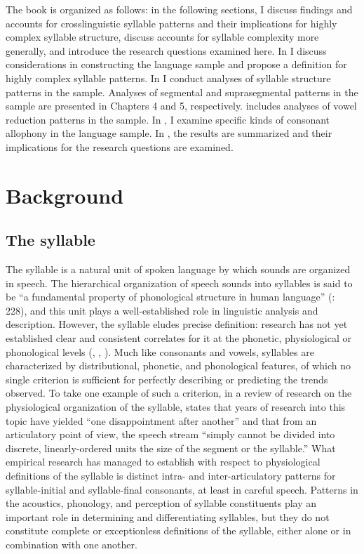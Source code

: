   The book is organized as follows: in the following sections, I discuss findings and accounts for crosslinguistic syllable patterns and their implications for highly complex syllable structure, discuss accounts for syllable complexity more generally, and introduce the research questions examined here. In  I discuss considerations in constructing the language sample and propose a definition for highly complex syllable patterns. In  I conduct analyses of syllable structure patterns in the sample. Analyses of segmental and suprasegmental patterns in the sample are presented in Chapters 4 and 5, respectively.  includes analyses of vowel reduction patterns in the sample. In , I examine specific kinds of consonant allophony in the language sample. In , the results are summarized and their implications for the research questions are examined.

\section{Background}\label{sec:1.1}
\subsection{The syllable}\label{sec:1.1.1}

  The syllable is a natural unit of spoken language by which sounds are organized in speech. The hierarchical organization of speech sounds into syllables is said to be “a fundamental property of phonological structure in human language” (\citealt{GoldsteinEtAl2006}: 228), and this unit plays a well-established role in linguistic analysis and description. However, the syllable eludes precise definition: research has not yet established clear and consistent correlates for it at the phonetic, physiological or phonological levels (\citealt{BellHooper1978}, \citealt{Laver1994}, \citealt{Krakow1999}). Much like consonants and vowels, syllables are characterized by distributional, phonetic, and phonological features, of which no single criterion is sufficient for perfectly describing or predicting the trends observed. To take one example of such a criterion, in a review of research on the physiological organization of the syllable, \citet[23-34]{Krakow1999} states that years of research into this topic have yielded “one disappointment after another” and that from an articulatory point of view, the speech stream “simply cannot be divided into discrete, linearly-ordered units the size of the segment or the syllable.” What empirical research has managed to establish with respect to physiological definitions of the syllable is distinct intra- and inter-articulatory patterns for syllable-initial and syllable-final consonants, at least in careful speech. Patterns in the acoustics, phonology, and perception of syllable constituents play an important role in determining and differentiating syllables, but they do not constitute complete or exceptionless definitions of the syllable, either alone or in combination with one another.

